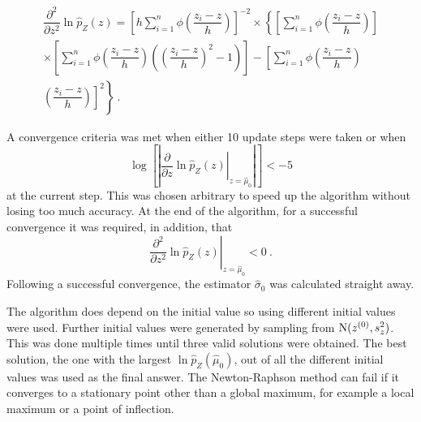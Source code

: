 \begin{multline}
  \dfrac{
    \partial^2
  }
  {
    \partial z^2
  }
  \ln\widehat{p}_Z(z)
  =
  \left[
    h\sum_{i=1}^n
    \phi\left(
      \dfrac{
        z_i-z
      }
      {
        h
      }
    \right)
  \right]^{-2}
  \times
  \left\{
    \left[
      \sum_{i=1}^n
      \phi\left(
        \dfrac{
          z_i-z
        }
        {
          h
        }
      \right)
    \right]
  \right.
  \\
  \left.
    \times
    \left[
      \sum_{i=1}^n
      \phi\left(
        \dfrac{
          z_i-z
        }
        {
          h
        }
      \right)
      \left(
        \left(
          \dfrac{
            z_i-z
          }
          {
            h
          }
        \right)^2
        -1
      \right)
    \right]
    -
    \left[
      \sum_{i=1}^n
      \phi\left(
        \dfrac{
          z_i-z
        }
        {
          h
        }
      \right)
    \right.
  \right.
  \\
  \left.
    \left.
      \left(
        \dfrac{
          z_i-z
        }
        {
          h
        }
      \right)
    \right]^2
  \right\}
  \ .
\end{multline}

A convergence criteria was met when either 10 update steps were taken or when
\begin{equation}
  \log\left[\left|
    \left.
    \dfrac{
      \partial
    }
    {
      \partial z
    }
  \ln\widehat{p}_Z(z)
  \right|_{z=\widehat{\mu}_0}
  \right|\right]
  <-5
\end{equation}
at the current step. This was chosen arbitrary to speed up the algorithm without losing too much accuracy. At the end of the algorithm, for a successful convergence it was required, in addition, that
\begin{equation}
  \left.
    \dfrac{
      \partial^2
    }
    {
      \partial z^2
    }
    \ln\widehat{p}_Z(z)
  \right|_{z=\widehat{\mu}_0}
  < 0 \ .
\end{equation}
Following a successful convergence, the estimator $\widehat{\sigma}_0$ was calculated straight away.

The algorithm does depend on the initial value so using different initial values were used. Further initial values were generated by sampling from $\operatorname{N}(z^{(0)}, s_z^2)$. This was done multiple times until three valid solutions were obtained. The best solution, the one with the largest $\ln\widehat{p}_Z\left(\widehat{\mu}_0\right)$, out of all the different initial values was used as the final answer. The Newton-Raphson method can fail if it converges to a stationary point other than a global maximum, for example a local maximum or a point of inflection. 


